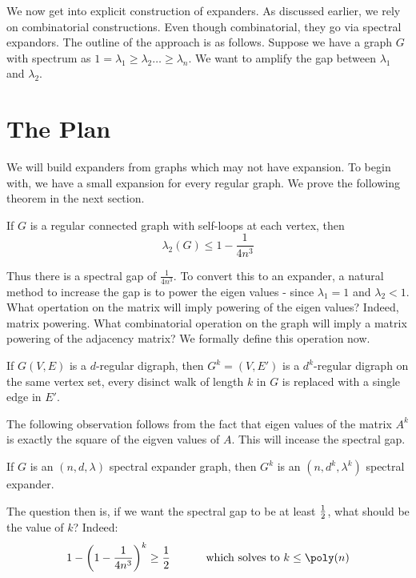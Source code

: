 
We now get into explicit construction of expanders. As discussed earlier, we rely on combinatorial constructions. Even though combinatorial, they go via spectral expandors. The outline of the approach is as follows. Suppose we have a graph $G$ with spectrum as $1=\lambda_1 \ge \lambda_2 \ldots \ge \lambda_n$. We want to amplify the gap between $\lambda_1$ and $\lambda_2$. 

\section{The Plan}
We will build expanders from graphs which may not have expansion. To begin with, we have a small expansion for every regular graph. We prove the following theorem in the next section.

\begin{theorem}
\label{thm:spectralgap-graphs}
If $G$ is a regular connected graph with self-loops at each vertex, then $$\lambda_2(G) \le 1-\frac{1}{4n^3}$$
\end{theorem}

Thus there is a spectral gap of $\frac{1}{4n^3}$. To convert this to an expander, a natural method to increase the gap is to power the eigen values - since $\lambda_1 = 1$ and $\lambda_2 < 1$. What opertation on the matrix will imply powering of the eigen values? Indeed, matrix powering. What combinatorial operation on the graph will imply a matrix powering of the adjacency matrix? We formally define this operation now.

\begin{definition}
If $G(V,E)$ is a $d$-regular
digraph, then $G^k =(V,E')$ is a $d^k$-regular digraph on the same vertex set, every disinct walk of length $k$ in $G$ is replaced with a single edge in $E'$.
\end{definition}

The following observation follows from the fact that eigen values of the matrix $A^k$ is exactly the square of the eigven values of $A$. This will incease the spectral gap.
\begin{lemma}
If $G$ is an $(n,d,\lambda)$ spectral expander graph, then $G^k$ is an $(n,d^k,\lambda^k)$ spectral expander.
\end{lemma}

The question then is, if we want the spectral gap to be at least $\frac{1}{2}$, what should be the value of $k$? Indeed:
$$ 1-\left(1-\frac{1}{4n^3}\right)^k \ge \half \textrm{\hspace{1cm} which solves to $k \le \poly(n)$}$$

